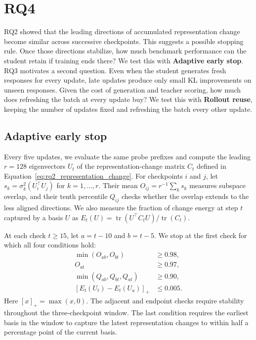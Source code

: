 \section{RQ4}
\label{sec:efficiency}

RQ2 showed that the leading directions of accumulated representation change become similar across successive checkpoints. This suggests a possible stopping rule. Once those directions stabilize, how much benchmark performance can the student retain if training ends there? We test this with \textbf{Adaptive early stop}. RQ3 motivates a second question. Even when the student generates fresh responses for every update, late updates produce only small KL improvements on unseen responses. Given the cost of generation and teacher scoring, how much does refreshing the batch at every update buy? We test this with \textbf{Rollout reuse}, keeping the number of updates fixed and refreshing the batch every other update.

\subsection{Adaptive early stop}
Every five updates, we evaluate the same probe prefixes and compute the leading $r=128$ eigenvectors $U_t$ of the representation-change matrix $C_t$ defined in Equation~\ref{eq:rq2_representation_change}. For checkpoints $i$ and $j$, let $s_k=\sigma_k^2(U_i^\top U_j)$ for $k=1,\ldots,r$. Their mean $O_{ij}=r^{-1}\sum_k s_k$ measures subspace overlap, and their tenth percentile $Q_{ij}$ checks whether the overlap extends to the less aligned directions. We also measure the fraction of change energy at step $t$ captured by a basis $U$ as $E_t(U)=\operatorname{tr}(U^\top C_t U)/\operatorname{tr}(C_t)$.

At each check $t\geq15$, let $a=t-10$ and $b=t-5$. We stop at the first check for which all four conditions hold:
\begin{equation}
\begin{aligned}
 \min(O_{ab},O_{bt}) &\geq 0.98,\\
 O_{at} &\geq 0.97,\\
 \min(Q_{ab},Q_{bt},Q_{at}) &\geq 0.90,\\
 [E_t(U_t)-E_t(U_a)]_+ &\leq 0.005 .
\end{aligned}
\label{eq:rq4_stop}
\end{equation}
Here $[x]_+=\max(x,0)$. The adjacent and endpoint checks require stability throughout the three-checkpoint window. The last condition requires the earliest basis in the window to capture the latest representation changes to within half a percentage point of the current basis.

